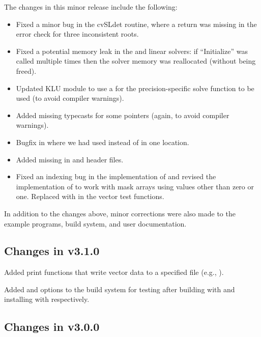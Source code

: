 The changes in this minor release include the following:
\begin{itemize}
\item Fixed a minor bug in the cvSLdet routine, where a return was missing
  in the error check for three inconsistent roots.

\item Fixed a potential memory leak in the {\spgmr} and {\spfgmr} linear
  solvers: if ``Initialize'' was called multiple times then the solver
  memory was reallocated (without being freed).

\item Updated KLU {\sunlinsol} module to use a  for the
  precision-specific solve function to be used (to avoid compiler
  warnings).

\item Added missing typecasts for some  pointers (again, to
  avoid compiler warnings).

\item Bugfix in  where we had used 
  instead of  in one location.

\item Added missing  in {\nvector} and {\sunmatrix}
  header files.

\item Fixed an indexing bug in the {\cuda} {\nvector} implementation of
   and revised the {\raja} {\nvector} implementation of
   to work with mask arrays using values other than zero or
  one. Replaced  with  in the {\raja} vector test functions.
\end{itemize}
In addition to the changes above, minor corrections were also made to the
example programs, build system, and user documentation.

\subsection*{Changes in v3.1.0}

Added {\nvector} print functions that write vector data to a specified
file (e.g., ).

Added  and  options to the build
system for testing {\sundials} after building with  and
installing with  respectively.

\subsection*{Changes in v3.0.0}

